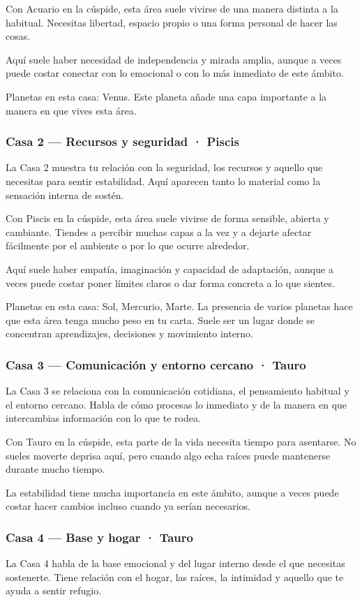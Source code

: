 \documentclass[11pt,a4paper]{article}
\begin{document}
Con Acuario en la cúspide, esta área suele vivirse de una manera distinta a la habitual. Necesitas libertad, espacio propio o una forma personal de hacer las cosas.

Aquí suele haber necesidad de independencia y mirada amplia, aunque a veces puede costar conectar con lo emocional o con lo más inmediato de este ámbito.

Planetas en esta casa: Venus. Este planeta añade una capa importante a la manera en que vives esta área.

\subsubsection*{Casa 2 — Recursos y seguridad · Piscis}
La Casa 2 muestra tu relación con la seguridad, los recursos y aquello que necesitas para sentir estabilidad. Aquí aparecen tanto lo material como la sensación interna de sostén.

Con Piscis en la cúspide, esta área suele vivirse de forma sensible, abierta y cambiante. Tiendes a percibir muchas capas a la vez y a dejarte afectar fácilmente por el ambiente o por lo que ocurre alrededor.

Aquí suele haber empatía, imaginación y capacidad de adaptación, aunque a veces puede costar poner límites claros o dar forma concreta a lo que sientes.

Planetas en esta casa: Sol, Mercurio, Marte. La presencia de varios planetas hace que esta área tenga mucho peso en tu carta. Suele ser un lugar donde se concentran aprendizajes, decisiones y movimiento interno.

\subsubsection*{Casa 3 — Comunicación y entorno cercano · Tauro}
La Casa 3 se relaciona con la comunicación cotidiana, el pensamiento habitual y el entorno cercano. Habla de cómo procesas lo inmediato y de la manera en que intercambias información con lo que te rodea.

Con Tauro en la cúspide, esta parte de la vida necesita tiempo para asentarse. No sueles moverte deprisa aquí, pero cuando algo echa raíces puede mantenerse durante mucho tiempo.

La estabilidad tiene mucha importancia en este ámbito, aunque a veces puede costar hacer cambios incluso cuando ya serían necesarios.

\subsubsection*{Casa 4 — Base y hogar · Tauro}
La Casa 4 habla de la base emocional y del lugar interno desde el que necesitas sostenerte. Tiene relación con el hogar, las raíces, la intimidad y aquello que te ayuda a sentir refugio.
\end{document}
